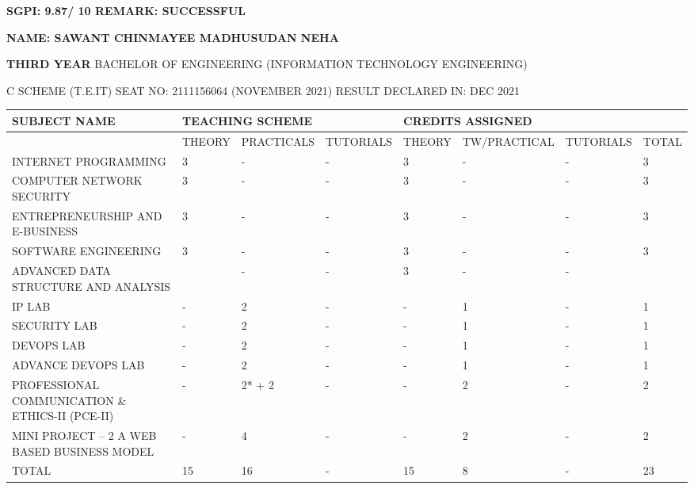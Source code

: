 \documentclass{article} %
\begin{document}
\textbf{}

\noindent \textbf{SGPI: 9.87/ 10                                                                           REMARK: SUCCESSFUL}

\noindent \textbf{\underbar{}}

\textbf{\underbar{}}

\textbf{\underbar{}}

\textbf{\underbar{}}

\textbf{\underbar{}}

\textbf{\underbar{}}

\textbf{}

\noindent 

\noindent \textbf{NAME: SAWANT CHINMAYEE MADHUSUDAN NEHA}

\noindent 

\noindent \textbf{THIRD YEAR} BACHELOR OF ENGINEERING (INFORMATION TECHNOLOGY ENGINEERING)

\noindent 

\noindent \textbf{} C SCHEME (T.E.IT)      SEAT NO: 2111156064 (NOVEMBER 2021)       RESULT DECLARED IN: DEC  2021

\noindent 

\noindent 

\begin{tabular}{|p{1.0in}|p{0.4in}|p{0.6in}|p{0.5in}|p{0.4in}|p{0.5in}|p{0.5in}|p{0.4in}|} \hline 
SUBJECT NAME & \multicolumn{3}{|p{1.5in}|}{TEACHING SCHEME} & \multicolumn{4}{|p{1.8in}|}{CREDITS ASSIGNED} \\ \hline 
 & THEORY & PRACTICALS & TUTORIALS & THEORY & TW/\newline PRACTICAL & TUTORIALS & TOTAL \\ \hline 
INTERNET PROGRAMMING & 3 & - & - & 3 & - & - & 3 \\ \hline 
COMPUTER NETWORK SECURITY & 3 & - & - & 3 & - & - & 3 \\ \hline 
ENTREPRENEURSHIP AND E-BUSINESS & 3 & - & - & 3 & - & - & 3 \\ \hline 
SOFTWARE ENGINEERING & 3 & - & - & 3 & - & - & 3 \\ \hline 
ADVANCED DATA STRUCTURE AND ANALYSIS & \newline 3 & - & - & 3 & - & - & \newline 3 \\ \hline 
IP LAB & - & 2 & - & - & 1 & - & 1 \\ \hline 
SECURITY LAB & - & 2 & - & - & 1 & - & 1 \\ \hline 
DEVOPS LAB & - & 2 & - & - & 1 & - & 1 \\ \hline 
ADVANCE DEVOPS LAB & - & 2 & - & - & 1 & - & 1 \\ \hline 
PROFESSIONAL COMMUNICATION \& ETHICS-II (PCE-II) & - & 2* + 2 & - & - & 2 & - & 2 \\ \hline 
MINI PROJECT -- 2 A WEB BASED BUSINESS MODEL & - & 4 & - & - & 2 & - & 2 \\ \hline 
TOTAL & 15 & 16 & - & 15 & 8 & - & 23 \\ \hline 
\end{tabular}
\end{document}
